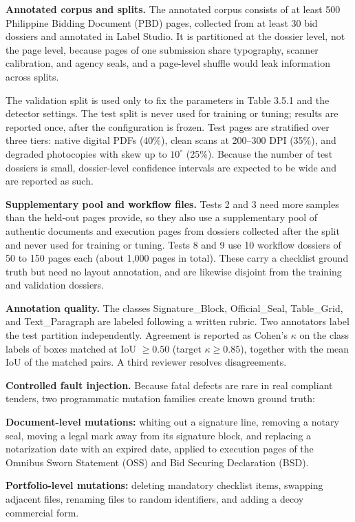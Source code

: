 \textbf{Annotated corpus and splits.} The annotated corpus consists of at least 500 Philippine Bidding Document (PBD) pages, collected from at least 30 bid dossiers and annotated in Label Studio. It is partitioned at the dossier level, not the page level, because pages of one submission share typography, scanner calibration, and agency seals, and a page-level shuffle would leak information across splits.

The validation split is used only to fix the parameters in Table 3.5.1 and the detector settings. The test split is never used for training or tuning; results are reported once, after the configuration is frozen. Test pages are stratified over three tiers: native digital PDFs (40\%), clean scans at 200--300 DPI (35\%), and degraded photocopies with skew up to $10^\circ$ (25\%). Because the number of test dossiers is small, dossier-level confidence intervals are expected to be wide and are reported as such.

\textbf{Supplementary pool and workflow files.} Tests 2 and 3 need more samples than the held-out pages provide, so they also use a supplementary pool of authentic documents and execution pages from dossiers collected after the split and never used for training or tuning. Tests 8 and 9 use 10 workflow dossiers of 50 to 150 pages each (about 1,000 pages in total). These carry a checklist ground truth but need no layout annotation, and are likewise disjoint from the training and validation dossiers.

\textbf{Annotation quality.} The classes Signature\_Block, Official\_Seal, Table\_Grid, and Text\_Paragraph are labeled following a written rubric. Two annotators label the test partition independently. Agreement is reported as Cohen's $\kappa$ on the class labels of boxes matched at IoU $\geq 0.50$ (target $\kappa \geq 0.85$), together with the mean IoU of the matched pairs. A third reviewer resolves disagreements.

\textbf{Controlled fault injection.} Because fatal defects are rare in real compliant tenders, two programmatic mutation families create known ground truth:

\textbf{Document-level mutations:} whiting out a signature line, removing a notary seal, moving a legal mark away from its signature block, and replacing a notarization date with an expired date, applied to execution pages of the Omnibus Sworn Statement (OSS) and Bid Securing Declaration (BSD).

\textbf{Portfolio-level mutations:} deleting mandatory checklist items, swapping adjacent files, renaming files to random identifiers, and adding a decoy commercial form.

